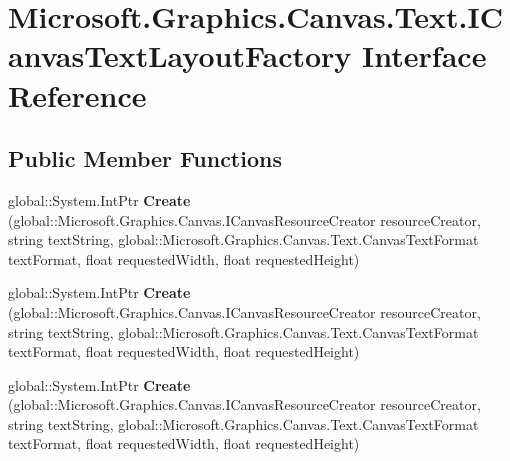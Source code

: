 \hypertarget{interface_microsoft_1_1_graphics_1_1_canvas_1_1_text_1_1_i_canvas_text_layout_factory}{}\section{Microsoft.\+Graphics.\+Canvas.\+Text.\+I\+Canvas\+Text\+Layout\+Factory Interface Reference}
\label{interface_microsoft_1_1_graphics_1_1_canvas_1_1_text_1_1_i_canvas_text_layout_factory}
\subsection*{Public Member Functions}
\begin{DoxyCompactItemize}
\item 
\mbox{\label{interface_microsoft_1_1_graphics_1_1_canvas_1_1_text_1_1_i_canvas_text_layout_factory_a654d0d251a9347d1808b81128c1ba60a}} 
global\+::\+System.\+Int\+Ptr {\bfseries Create} (global\+::\+Microsoft.\+Graphics.\+Canvas.\+I\+Canvas\+Resource\+Creator resource\+Creator, string text\+String, global\+::\+Microsoft.\+Graphics.\+Canvas.\+Text.\+Canvas\+Text\+Format text\+Format, float requested\+Width, float requested\+Height)
\item 
\mbox{\label{interface_microsoft_1_1_graphics_1_1_canvas_1_1_text_1_1_i_canvas_text_layout_factory_a654d0d251a9347d1808b81128c1ba60a}} 
global\+::\+System.\+Int\+Ptr {\bfseries Create} (global\+::\+Microsoft.\+Graphics.\+Canvas.\+I\+Canvas\+Resource\+Creator resource\+Creator, string text\+String, global\+::\+Microsoft.\+Graphics.\+Canvas.\+Text.\+Canvas\+Text\+Format text\+Format, float requested\+Width, float requested\+Height)
\item 
\mbox{\label{interface_microsoft_1_1_graphics_1_1_canvas_1_1_text_1_1_i_canvas_text_layout_factory_a654d0d251a9347d1808b81128c1ba60a}} 
global\+::\+System.\+Int\+Ptr {\bfseries Create} (global\+::\+Microsoft.\+Graphics.\+Canvas.\+I\+Canvas\+Resource\+Creator resource\+Creator, string text\+String, global\+::\+Microsoft.\+Graphics.\+Canvas.\+Text.\+Canvas\+Text\+Format text\+Format, float requested\+Width, float requested\+Height)

\end{DoxyCompactItemize}
